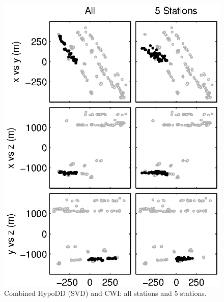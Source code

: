 \documentclass[extra]{gji}
\begin{document}
\begin{figure}
\includegraphics{diags/CalaverasLoc5_hypoDD_SVD.eps}
\caption{Combined HypoDD (SVD) and CWI: all stations and 5 stations.}
\label{fig-69Calaverasevents_eg1}
\end{figure}



\label{lastpage}
\end{document}
